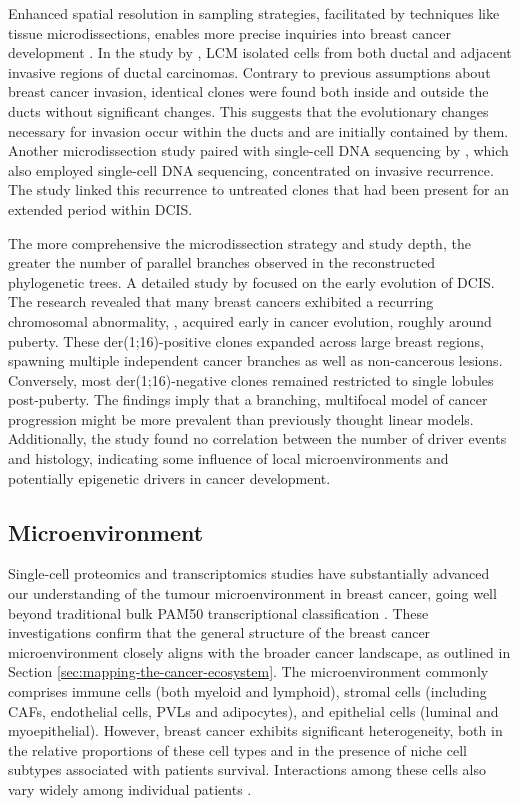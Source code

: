 Enhanced spatial resolution in sampling strategies, facilitated by techniques like tissue microdissections, enables more precise inquiries into breast cancer development . In the study by \textcite{Casasent2018-gx}, \ac{LCM} isolated cells from both ductal and adjacent invasive regions of ductal carcinomas. Contrary to previous assumptions about breast cancer invasion, identical clones were found both inside and outside the ducts without significant changes. This suggests that the evolutionary changes necessary for invasion occur within the ducts and are initially contained by them. Another microdissection study paired with single-cell DNA sequencing by \textcite{Lips2022-kv}, which also employed single-cell DNA sequencing, concentrated on invasive recurrence. The study linked this recurrence to untreated clones that had been present for an extended period within \ac{DCIS}.

The more comprehensive the microdissection strategy and study depth, the greater the number of parallel branches observed in the reconstructed phylogenetic trees. A detailed study by \parencite{Nishimura2023-mk} focused on the early evolution of \ac{DCIS}. The research revealed that many breast cancers exhibited a recurring chromosomal abnormality, , acquired early in cancer evolution, roughly around puberty. These der(1;16)-positive clones expanded across large breast regions, spawning multiple independent cancer branches as well as non-cancerous lesions. Conversely, most der(1;16)-negative clones remained restricted to single lobules post-puberty. The findings imply that a branching, multifocal model of cancer progression might be more prevalent than previously thought linear models. Additionally, the study found no correlation between the number of driver events and histology, indicating some influence of local microenvironments and potentially epigenetic drivers in cancer development.

\subsection{Microenvironment}

Single-cell proteomics and transcriptomics studies have substantially advanced our understanding of the tumour microenvironment in breast cancer, going well beyond traditional bulk PAM50 transcriptional classification \parencite{Wu2021-uq,Pal2021-rf,Wagner2019-zp}. These investigations confirm that the general structure of the breast cancer microenvironment closely aligns with the broader cancer landscape, as outlined in Section \cref{sec:mapping-the-cancer-ecosystem}. The microenvironment commonly comprises immune cells (both myeloid and lymphoid), stromal cells (including \acfp{CAF}, endothelial cells, \acfp{PVL} and adipocytes), and epithelial cells (luminal and myoepithelial). However, breast cancer exhibits significant heterogeneity, both in the relative proportions of these cell types and in the presence of niche cell subtypes associated with patients survival. Interactions among these cells also vary widely among individual patients \parencite{Danenberg2022-zb}.

